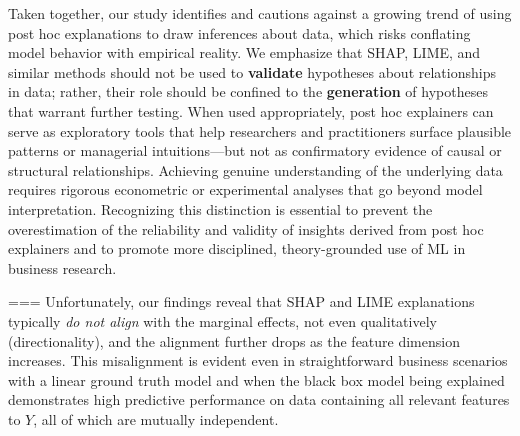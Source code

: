 \documentclass[mnsc,blindrev]{informs3}
\begin{document}
Taken together, our study identifies and cautions against a growing trend of using post hoc explanations to draw inferences about data, which risks conflating model behavior with empirical reality. We emphasize that SHAP, LIME, and similar methods should not be used to \textbf{validate} hypotheses about relationships in data; rather, their role should be confined to the \textbf{generation} of hypotheses that warrant further testing. When used appropriately, post hoc explainers can serve as exploratory tools that help researchers and practitioners surface plausible patterns or managerial intuitions—but not as confirmatory evidence of causal or structural relationships. Achieving genuine understanding of the underlying data requires rigorous econometric or experimental analyses that go beyond model interpretation. Recognizing this distinction is essential to prevent the overestimation of the reliability and validity of insights derived from post hoc explainers and to promote more disciplined, theory-grounded use of ML in business research.

===
Unfortunately, our findings reveal that SHAP and LIME explanations typically \textit{do not align} with the marginal effects, not even qualitatively (directionality), and the alignment further drops as the feature dimension increases. This misalignment is evident even in straightforward business scenarios with a linear ground truth model and when the black box model being explained demonstrates high predictive performance on data containing all relevant features to $Y$, all of which are mutually independent. 
\end{document}
